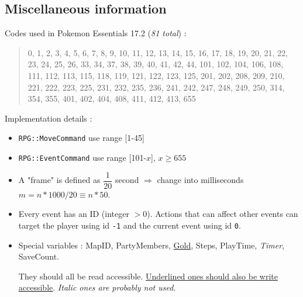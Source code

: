 \documentclass[11pt]{article}
\begin{document}

\subsection{Miscellaneous information}

Codes used in Pokemon Essentials 17.2 (\textit{81 total}) :
\begin{quote}
	0, 1, 2, 3, 4, 5, 6, 7, 8, 9, 10, 11, 12, 13, 14, 15, 16, 17, 18, 19, 20, 21, 22, 23, 24, 25, 26, 33, 34, 37, 38, 39, 40, 41, 42, 44, 101, 102, 104, 106, 108, 111, 112, 113, 115, 118, 119, 121, 122, 123, 125, 201, 202, 208, 209, 210, 221, 222, 223, 225, 231, 232, 235, 236, 241, 242, 247, 248, 249, 250, 314, 354, 355, 401, 402, 404, 408, 411, 412, 413, 655
\end{quote}

Implementation details :
\begin{itemize}
	\item \verb|RPG::MoveCommand| use range [1-45]
	
	\item \verb|RPG::EventCommand| use range [101-$x$], $x\geq 655$
	
	\item A "frame" is defined as $\dfrac{1}{20}$ second $\Rightarrow$ change into milliseconds $m=n*1000/20\equiv n*50$.
	
	\item Every event has an ID (integer $>0$). Actions that can affect other events can target the player using id \verb|-1| and the current event using id \verb|0|.
	
	\item Special variables : MapID, PartyMembers, \underline{Gold}, Steps, PlayTime, \textit{Timer}, SaveCount.
	
	They should all be read accessible. \underline{Underlined ones should also be write accessible}. \textit{Italic ones are probably not used}.
\end{itemize}



\vspace{4mm}
\end{document}
